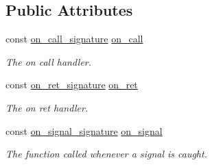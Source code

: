 \subsection*{Public Attributes}
\begin{DoxyCompactItemize}
\item 
const \hyperlink{class_s_s_handlers_aa202bfb2f7c6236c0f1ee6f61d366487}{on\+\_\+call\+\_\+signature} \hyperlink{class_s_s_handlers_a2cd9221058871db09200f523f78bfb03}{on\+\_\+call}
\begin{DoxyCompactList}\small\item\em The \textquotesingle{}on call\textquotesingle{} handler. \end{DoxyCompactList}\item 
const \hyperlink{class_s_s_handlers_a0aff437ef4f59faacb14bb1fb55e214c}{on\+\_\+ret\+\_\+signature} \hyperlink{class_s_s_handlers_a2044718e6183b14442c9bc9295b3dda2}{on\+\_\+ret}
\begin{DoxyCompactList}\small\item\em The \textquotesingle{}on ret\textquotesingle{} handler. \end{DoxyCompactList}\item 
const \hyperlink{class_s_s_handlers_a7b77d0dda29c2fe22e6aeddd4807387f}{on\+\_\+signal\+\_\+signature} \hyperlink{class_s_s_handlers_a9933cca29ab671706a5df494e3fb3532}{on\+\_\+signal}
\begin{DoxyCompactList}\small\item\em The function called whenever a signal is caught. \end{DoxyCompactList}\end{DoxyCompactItemize}
